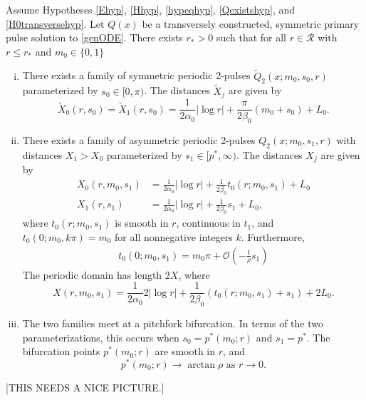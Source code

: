 \documentclass[thesis.tex]{subfiles}
\begin{document}
\begin{theorem}\label{2pulsebifurcation}
Assume Hypotheses \ref{Ehyp}, \ref{Hhyp}, \ref{hypeqhyp}, \ref{Qexistshyp}, and \ref{H0transversehyp}. Let $Q(x)$ be a transversely constructed, symmetric primary pulse solution to \eqref{genODE}. There exists $r_* > 0$ such that for all $r \in \mathcal{R}$ with $r \leq r_*$ and $m_0 \in \{0, 1\}$
\begin{enumerate}[(i)]
	\item There exists a family of symmetric periodic 2-pulses $\tilde{Q}_2(x; m_0, s_0, r)$ parameterized by $s_0 \in [0, \pi)$. The distances $\tilde{X}_j$ are given by
	\begin{equation}\label{2psymmdist}
		\tilde{X}_0(r, s_0) = \tilde{X}_1(r, s_0) = \frac{1}{2 \alpha_0} |\log r| + \frac{\pi}{2\beta_0} (m_0 + s_0) + L_0.
	\end{equation}
	\item There exists a family of asymmetric periodic 2-pulses $Q_2(x; m_0, s_1, r)$ with distances $X_1 > X_0$ parameterized by $s_1 \in [p^*, \infty)$. The distances $X_j$ are given by
	\begin{equation}\label{2pasymmdist}
	\begin{aligned}
		X_0(r, m_0, s_1) &= \frac{1}{2 \alpha_0} |\log r| + \frac{1}{2\beta_0} t_0(r; m_0, s_1) + L_0 \\
		X_1(r, s_1) &= \frac{1}{2 \alpha_0} |\log r| + \frac{1}{2\beta_0} s_1 + L_0, 
	\end{aligned}
	\end{equation}
	where $t_0(r; m_0, s_1)$ is smooth in $r$, continuous in $t_1$, and $t_0(0; m_0, k \pi) = m_0$ for all nonnegative integers $k$. Furthermore,
	\begin{align}\label{deft0}
	t_0(0; m_0, s_1) = m_0 \pi + \mathcal{O}\left(-\frac{1}{\rho} s_1 \right)
	\end{align}
	The periodic domain has length $2X$, where
	\begin{equation}\label{X2pdomain}
	X(r, m_0, s_1) = \frac{1}{2 \alpha_0} 2 |\log r| + \frac{1}{2\beta_0} \left( t_0(r; m_0, s_1) + s_1\right) + 2 L_0.
	\end{equation}

	\item The two families meet at a pitchfork bifurcation. In terms of the two parameterizations, this occurs when $s_0 = p^*(m_0; r)$ and $s_1 = p^*$. The bifurcation points $p^*(m_0; r)$ are smooth in $r$, and
	\[
	p^*(m_0; r) \rightarrow \arctan \rho \text{ as }r \rightarrow 0.
	\]
\end{enumerate}
\end{theorem}
[THIS NEEDS A NICE PICTURE.]
\end{document}
